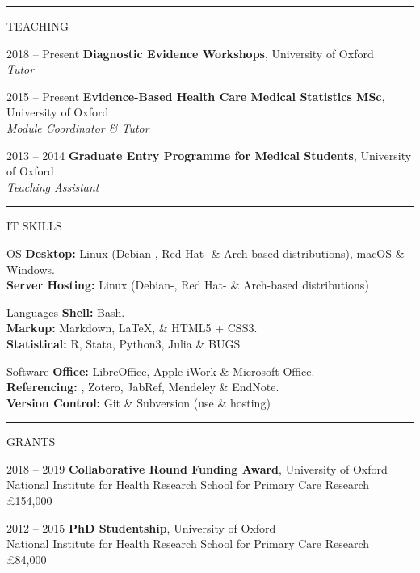\documentclass[10pt,a4paper]{article}
\begin{document}
\noindent\rule{\textwidth}{0.4pt}
\begin{cvlist}{TEACHING}
  
  \item[2018 -- Present]
  \textbf{Diagnostic Evidence Workshops}, University of Oxford \\
  \textit{Tutor}
  
  \item[2015 -- Present]
  \textbf{Evidence-Based Health Care Medical Statistics MSc}, University of Oxford \\
  \textit{Module Coordinator \& Tutor}
  
  \item[2013 -- 2014]
  \textbf{Graduate Entry Programme for Medical Students}, University of Oxford \\
  \textit{Teaching Assistant}
  
\end{cvlist}


\noindent\rule{\textwidth}{0.4pt}
\begin{cvlist}{IT SKILLS}

  \item[OS]
  \textbf{Desktop:} Linux (Debian-, Red Hat- \& Arch-based distributions), macOS \& Windows. \\
  \textbf{Server Hosting:} Linux (Debian-, Red Hat- \& Arch-based distributions)
  
  \item[Languages]
  \textbf{Shell:} Bash. \\
  \textbf{Markup:} Markdown, \LaTeX , \& HTML5 + CSS3. \\
  \textbf{Statistical:} R, Stata, Python3, Julia \& BUGS
  
  \item[Software]
  \textbf{Office:} LibreOffice, Apple iWork \& Microsoft Office. \\
  \textbf{Referencing:} , Zotero, JabRef, Mendeley \& EndNote. \\
  \textbf{Version Control:} Git \& Subversion (use \& hosting)
  
\end{cvlist}


\noindent\rule{\textwidth}{0.4pt}
\begin{cvlist}{GRANTS}
  
  \item[2018 -- 2019]
  \textbf{Collaborative Round Funding Award}, University of Oxford \\
  National Institute for Health Research School for Primary Care Research \\
  \pounds 154,000
  
  \item[2012 -- 2015]
  \textbf{PhD Studentship}, University of Oxford \\
  National Institute for Health Research School for Primary Care Research \\
  \pounds 84,000
  
\end{cvlist}
\end{document}
